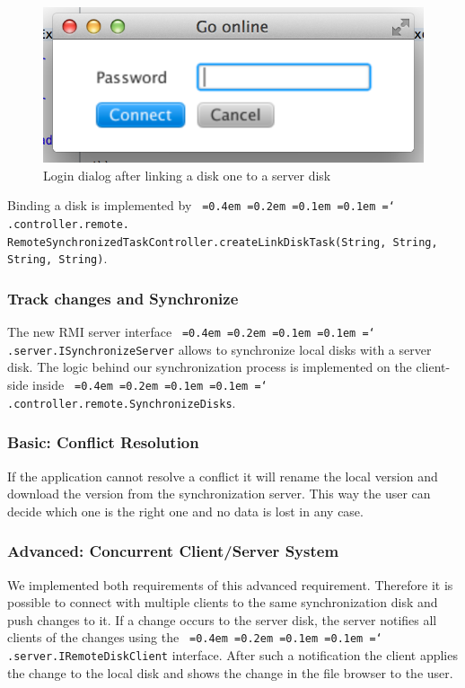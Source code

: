 \documentclass[a4paper,12pt]{article}
\newcommand*\justify{%
  \fontdimen2\font=0.4em%
  \fontdimen3\font=0.2em%
  \fontdimen4\font=0.1em%
  \fontdimen7\font=0.1em%
  \hyphenchar\font=`\-%
}
\newcommand{\mono}[1]{\texttt{\justify #1}}
\begin{document}
\begin{figure}[H]\centering
    \includegraphics[scale=0.7]{login.png}
    \caption{Login dialog after linking a disk one to a server disk}
\end{figure}

Binding a disk is implemented by \mono{.controller.remote.\\ RemoteSynchronizedTaskController.createLinkDiskTask(String, String, String, String)}.

\subsubsection{Track changes and Synchronize}
The new RMI server interface \mono{.server.ISynchronizeServer} allows to synchronize local disks with a server disk. The logic behind our synchronization process is implemented on the client-side inside \mono{.controller.remote.SynchronizeDisks}.

\subsubsection{Basic: Conflict Resolution}
If the application cannot resolve a conflict it will rename the local version and download the version from the synchronization server. This way the user can decide which one is the right one and no data is lost in any case.

\subsubsection{Advanced: Concurrent Client/Server System}
We implemented both requirements of this advanced requirement. Therefore it is possible to connect with multiple clients to the same synchronization disk and push changes to it. If a change occurs to the server disk, the server notifies all clients of the changes using the \mono{.server.IRemoteDiskClient} interface. After such a notification the client applies the change to the local disk and shows the change in the file browser to the user.
\end{document}
